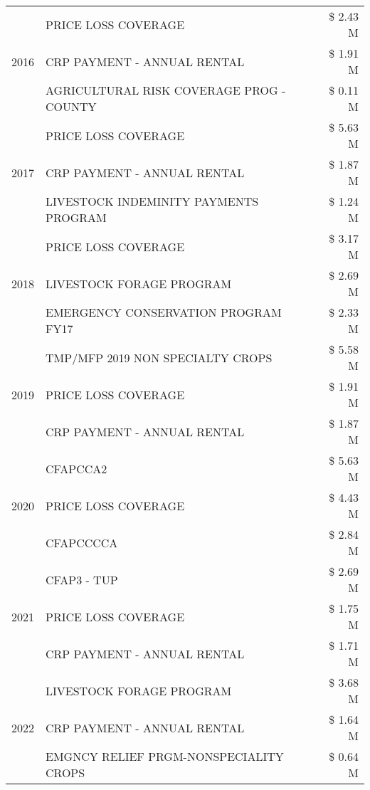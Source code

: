 \begin{tabular}{llr}
\cline{1-3}
\multirow[t]{3}{*}{2016} & PRICE LOSS COVERAGE & \$ 2.43 M \\
 & CRP PAYMENT - ANNUAL RENTAL & \$ 1.91 M \\
 & AGRICULTURAL RISK COVERAGE PROG - COUNTY & \$ 0.11 M \\
\cline{1-3}
\multirow[t]{3}{*}{2017} & PRICE LOSS COVERAGE & \$ 5.63 M \\
 & CRP PAYMENT - ANNUAL RENTAL & \$ 1.87 M \\
 & LIVESTOCK INDEMINITY PAYMENTS PROGRAM & \$ 1.24 M \\
\cline{1-3}
\multirow[t]{3}{*}{2018} & PRICE LOSS COVERAGE & \$ 3.17 M \\
 & LIVESTOCK FORAGE PROGRAM & \$ 2.69 M \\
 & EMERGENCY CONSERVATION PROGRAM FY17 & \$ 2.33 M \\
\cline{1-3}
\multirow[t]{3}{*}{2019} & TMP/MFP 2019 NON SPECIALTY CROPS & \$ 5.58 M \\
 & PRICE LOSS COVERAGE & \$ 1.91 M \\
 & CRP PAYMENT - ANNUAL RENTAL & \$ 1.87 M \\
\cline{1-3}
\multirow[t]{3}{*}{2020} & CFAPCCA2 & \$ 5.63 M \\
 & PRICE LOSS COVERAGE & \$ 4.43 M \\
 & CFAPCCCCA & \$ 2.84 M \\
\cline{1-3}
\multirow[t]{3}{*}{2021} & CFAP3 - TUP & \$ 2.69 M \\
 & PRICE LOSS COVERAGE & \$ 1.75 M \\
 & CRP PAYMENT - ANNUAL RENTAL & \$ 1.71 M \\
\cline{1-3}
\multirow[t]{3}{*}{2022} & LIVESTOCK FORAGE PROGRAM & \$ 3.68 M \\
 & CRP PAYMENT - ANNUAL RENTAL & \$ 1.64 M \\
 & EMGNCY RELIEF PRGM-NONSPECIALITY CROPS & \$ 0.64 M \\
\cline{1-3}
\bottomrule
\end{tabular}
